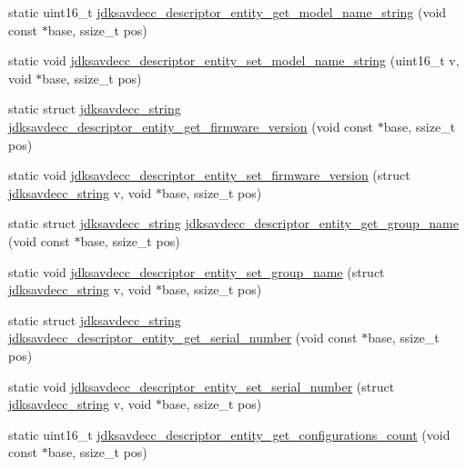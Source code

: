 \begin{DoxyCompactItemize}
\item 
static uint16\+\_\+t \hyperlink{group__descriptor__entity_gadcff92a34872a1eadabfa541a0217b5e}{jdksavdecc\+\_\+descriptor\+\_\+entity\+\_\+get\+\_\+model\+\_\+name\+\_\+string} (void const $\ast$base, ssize\+\_\+t pos)
\item 
static void \hyperlink{group__descriptor__entity_gaa48d9cb8441f774c99716eae31c48104}{jdksavdecc\+\_\+descriptor\+\_\+entity\+\_\+set\+\_\+model\+\_\+name\+\_\+string} (uint16\+\_\+t v, void $\ast$base, ssize\+\_\+t pos)
\item 
static struct \hyperlink{structjdksavdecc__string}{jdksavdecc\+\_\+string} \hyperlink{group__descriptor__entity_ga83b63c5c1c1513a3743386fc6914911f}{jdksavdecc\+\_\+descriptor\+\_\+entity\+\_\+get\+\_\+firmware\+\_\+version} (void const $\ast$base, ssize\+\_\+t pos)
\item 
static void \hyperlink{group__descriptor__entity_gabcd027285c1ff1ded0880b7dbe2528ec}{jdksavdecc\+\_\+descriptor\+\_\+entity\+\_\+set\+\_\+firmware\+\_\+version} (struct \hyperlink{structjdksavdecc__string}{jdksavdecc\+\_\+string} v, void $\ast$base, ssize\+\_\+t pos)
\item 
static struct \hyperlink{structjdksavdecc__string}{jdksavdecc\+\_\+string} \hyperlink{group__descriptor__entity_gace7a1e53c9a194cfde161de55ad00e3b}{jdksavdecc\+\_\+descriptor\+\_\+entity\+\_\+get\+\_\+group\+\_\+name} (void const $\ast$base, ssize\+\_\+t pos)
\item 
static void \hyperlink{group__descriptor__entity_gab440d6d94e09324c658e35852ea54045}{jdksavdecc\+\_\+descriptor\+\_\+entity\+\_\+set\+\_\+group\+\_\+name} (struct \hyperlink{structjdksavdecc__string}{jdksavdecc\+\_\+string} v, void $\ast$base, ssize\+\_\+t pos)
\item 
static struct \hyperlink{structjdksavdecc__string}{jdksavdecc\+\_\+string} \hyperlink{group__descriptor__entity_gae50c8c6e7a521b7cd693b2433e1f9e57}{jdksavdecc\+\_\+descriptor\+\_\+entity\+\_\+get\+\_\+serial\+\_\+number} (void const $\ast$base, ssize\+\_\+t pos)
\item 
static void \hyperlink{group__descriptor__entity_gadafdafafeaf27d1f8a29aebeece5a93b}{jdksavdecc\+\_\+descriptor\+\_\+entity\+\_\+set\+\_\+serial\+\_\+number} (struct \hyperlink{structjdksavdecc__string}{jdksavdecc\+\_\+string} v, void $\ast$base, ssize\+\_\+t pos)
\item 
static uint16\+\_\+t \hyperlink{group__descriptor__entity_gad0ec7e94eb9500a30d558230e4adbd12}{jdksavdecc\+\_\+descriptor\+\_\+entity\+\_\+get\+\_\+configurations\+\_\+count} (void const $\ast$base, ssize\+\_\+t pos)

\end{DoxyCompactItemize}
